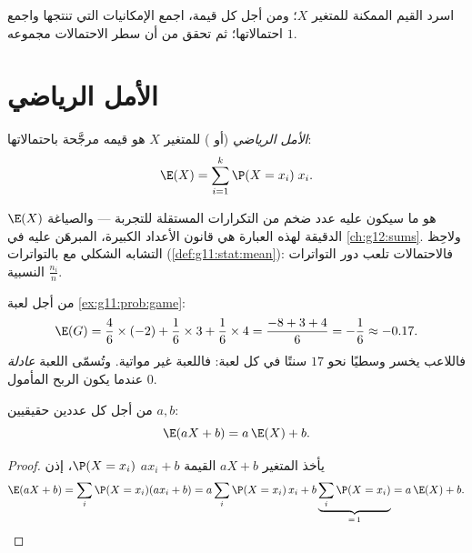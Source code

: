 \begin{method}\label{met:g11:prob:table}
اسرد القيم الممكنة للمتغير $X$؛ ومن أجل كل قيمة، اجمع الإمكانيات
التي تنتجها واجمع احتمالاتها؛ ثم تحقق من أن سطر
الاحتمالات مجموعه $1$.
\end{method}

\section{الأمل الرياضي}

\begin{definition}\label{def:g11:prob:expectation}
\emph{الأمل الرياضي} (أو ) للمتغير $X$ هو 
قيمه مرجَّحة باحتمالاتها:
\[
\E(X) = \sum_{i=1}^{k} \P(X = x_i)\; x_i .
\]
\end{definition}

\begin{remark}
$\E(X)$ هو ما سيكون عليه  عدد ضخم من التكرارات المستقلة
للتجربة --- والصياغة الدقيقة لهذه العبارة هي
قانون الأعداد الكبيرة، المبرهَن عليه في \cref{ch:g12:sums}. ولاحِظ التشابه
الشكلي مع   بالتواترات
(\cref{def:g11:stat:mean}): فالاحتمالات تلعب دور
التواترات النسبية $\frac{n_i}{n}$.
\end{remark}

\begin{example}\label{ex:g11:prob:gameexp}
من أجل لعبة \cref{ex:g11:prob:game}:
\[
\E(G) = \frac46 \times (-2) + \frac16 \times 3 + \frac16 \times 4
= \frac{-8 + 3 + 4}{6} = -\frac16 \approx -0.17 .
\]
فاللاعب يخسر وسطيًا نحو $17$ سنتًا في كل لعبة: فاللعبة
غير مواتية. وتُسمّى اللعبة \emph{عادلة} عندما يكون الربح المأمول $0$.
\end{example}

\begin{proposition}[الخطية]\label{prop:g11:prob:linearity}
من أجل كل عددين حقيقيين $a, b$:
\[
\E(aX + b) = a\,\E(X) + b .
\]
\end{proposition}

\begin{proof}
يأخذ المتغير $aX + b$ القيمة $a x_i + b$ 
$\P(X = x_i)$، إذن
\[
\E(aX + b) = \sum_i \P(X = x_i)(a x_i + b)
= a \sum_i \P(X = x_i)\,x_i + b \underbrace{\sum_i \P(X =
x_i)}_{=\,1} = a\,\E(X) + b .
\]
\end{proof}

